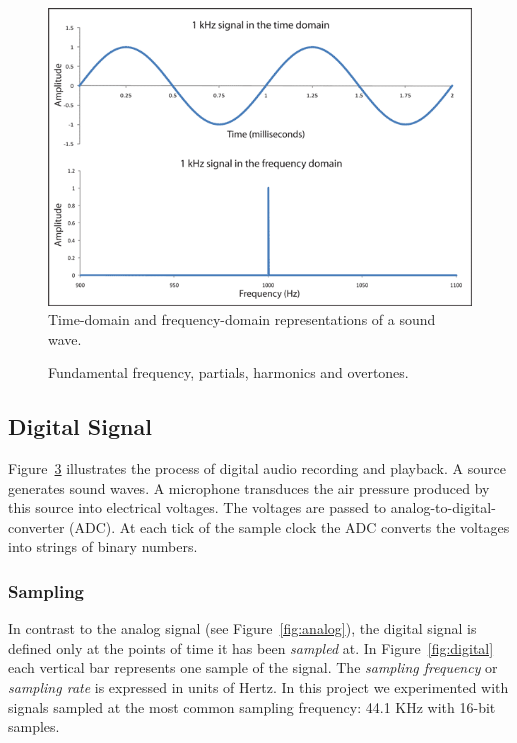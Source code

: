 \documentclass[11pt]{article} %
\begin{document}
\begin{figure}[h!]
\begin{center}
\includegraphics[scale=0.6]{TimeDomain}
\end{center}
\caption{Time-domain and frequency-domain representations of a sound wave.}
\label{fig:representations}
\end{figure}


\begin{figure}[h!]
\caption{Fundamental frequency, partials, harmonics and overtones.}
\label{fig:partials_harmonics}
\end{figure}

\subsection{Digital Signal}
Figure~\ref{fig:digital_recording} illustrates the process of digital audio recording and playback. A source generates sound waves. A microphone transduces the air pressure produced by this source into electrical voltages. The voltages are passed to analog-to-digital-converter (ADC). At each tick of the sample clock the ADC converts the voltages into strings of binary numbers.

\begin{figure}[h!]
\label{fig:digital_recording}
\end{figure}

\subsubsection{Sampling}
In contrast to the analog signal (see Figure~\ref{fig:analog}), the digital signal is defined only at the points of time it has been \textit{sampled} at. In Figure~\ref{fig:digital} each vertical bar represents one sample of the signal. The \textit{sampling frequency} or \textit{sampling rate} is expressed in units of Hertz. In this project we experimented with signals sampled at the most common sampling frequency: 44.1 KHz with 16-bit samples. 
%
%
\end{document}
